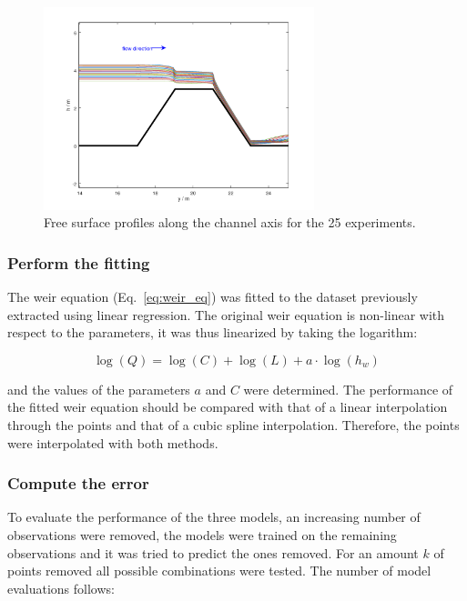 \begin{figure}[h]
  \centering
  \includegraphics[width=0.7\textwidth]{Figures/free_surfaces.png}
  \caption{Free surface profiles along the channel axis for the \num{25} experiments.}
  \label{fig:free_surfaces}
\end{figure}


\subsubsection{Perform the fitting}
The weir equation (Eq.~\ref{eq:weir_eq}) was fitted to the dataset previously extracted using linear regression.
The original weir equation is non-linear with respect to the parameters, it was thus linearized by taking the logarithm:

\begin{equation}
  \log(Q) = \log(C) + \log(L) + a \cdot \log(h_w)
\end{equation}

\noindent and the values of the parameters $a$ and $C$ were determined.
The performance of the fitted weir equation should be compared with that of a linear interpolation through the points and that of a cubic spline interpolation.
Therefore, the points were interpolated with both methods.


\subsubsection{Compute the error}
To evaluate the performance of the three models, an increasing number of observations were removed, the models were trained on the remaining observations and it was tried to predict the ones removed.
For an amount $k$ of points removed all possible combinations were tested. The number of model evaluations follows:

